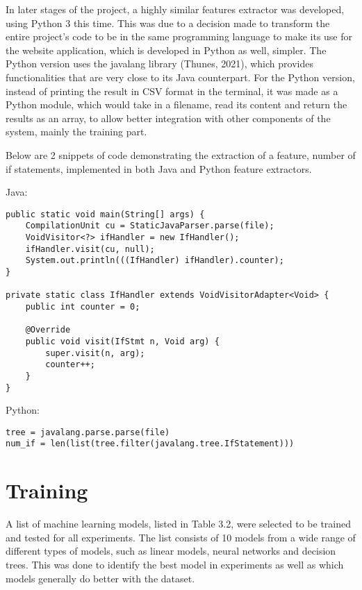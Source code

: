 \documentclass{report}
\begin{document}
In later stages of the project, a highly similar features extractor was developed, using Python 3 this time. This was due to a decision made to transform the entire project’s code to be in the same programming language to make its use for the website application, which is developed in Python as well, simpler. The Python version uses the javalang library (Thunes, 2021), which provides functionalities that are very close to its Java counterpart. For the Python version, instead of printing the result in CSV format in the terminal, it was made as a Python module, which would take in a filename, read its content and return the results as an array, to allow better integration with other components of the system, mainly the training part.

Below are 2 snippets of code demonstrating the extraction of a feature, number of if statements, implemented in both Java and Python feature extractors.

Java:

\begin{lstlisting}
public static void main(String[] args) {
    CompilationUnit cu = StaticJavaParser.parse(file);
    VoidVisitor<?> ifHandler = new IfHandler();
    ifHandler.visit(cu, null);
    System.out.println(((IfHandler) ifHandler).counter);
}

private static class IfHandler extends VoidVisitorAdapter<Void> {
    public int counter = 0;

    @Override
    public void visit(IfStmt n, Void arg) {
        super.visit(n, arg);
        counter++;
    }
}
\end{lstlisting}

Python:

\begin{lstlisting}
tree = javalang.parse.parse(file)
num_if = len(list(tree.filter(javalang.tree.IfStatement)))
\end{lstlisting}

\section{Training}

A list of machine learning models, listed in Table 3.2, were selected to be trained and tested for all experiments. The list consists of 10 models from a wide range of different types of models, such as linear models, neural networks and decision trees. This was done to identify the best model in experiments as well as which models generally do better with the dataset.
\end{document}
